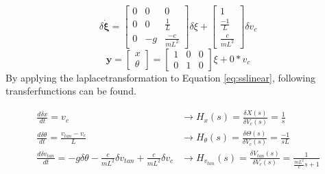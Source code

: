 \documentclass[a4paper,kul]{kulakarticle} %
\begin{document}
\begin{equation}
	\label{eq:sslinear}
	\delta\mathbf{\dot{\xi}} = \begin{bmatrix}
	0&0&0\\0&0&\frac{1}{L}\\0&-g&\frac{-c}{mL^2}
	\end{bmatrix} \delta\xi + \begin{bmatrix}
	1\\\frac{-1}{L}\\\frac{c}{mL^2}
	\end{bmatrix} \delta v_c
\end{equation}
\begin{equation}
	\mathbf{y} 
		= \begin{bmatrix}
	x\\\theta
	\end{bmatrix} = \begin{bmatrix}
	1&0&0\\0&1&0
	\end{bmatrix}\xi + 0*v_c
\end{equation}
By applying the laplacetransformation to Equation \ref{eq:sslinear}, following transferfunctions can be found. 

\begin{equation}
\begin{split}
\frac{d\delta x}{dt} = v_c &\rightarrow H_x(s) = \frac{\delta X(s)}{\delta V_c(s)} = \frac{1}{s}\\
\frac{d\delta \theta}{dt} = \frac{v_{tan}-v_c}{L} &\rightarrow H_{\theta}(s) = \frac{\delta \Theta(s)}{\delta V_c(s)} = \frac{-1}{sL}\\
\frac{d\delta v_{tan}}{dt} = -g\delta\theta - \frac{c}{mL^2}\delta v_{tan} +  \frac{c}{mL^2} \delta v_c &\rightarrow H_{v_{tan}}(s) = \frac{\delta V_{tan}(s)}{\delta V_c(s)} = \frac{1}{\frac{mL^2}{c}s+1}
\end{split}
\end{equation}
\end{document}
